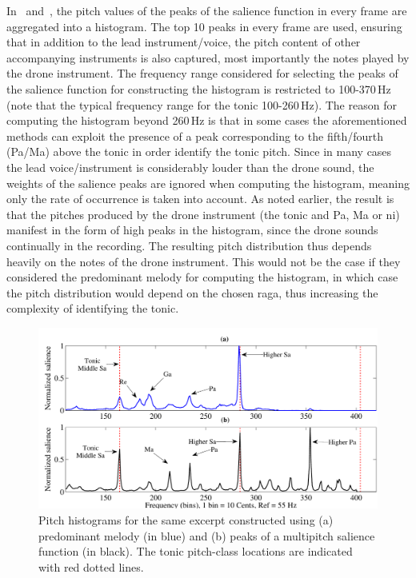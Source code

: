 In~\cite{salamon2012multipitch} and~\cite{gulati2012two}, the pitch values of the peaks of the salience function in every frame are aggregated into a histogram. The top 10 peaks in every frame are used, ensuring that in addition to the lead instrument/voice, the pitch content of other accompanying instruments is also captured, most importantly the notes played by the drone instrument. The frequency range considered for selecting the peaks of the salience function for constructing the histogram is restricted to 100-370\,Hz (note that the typical frequency range for the tonic 100-260\,Hz). The reason for computing the histogram beyond 260\,Hz is that in some cases the aforementioned methods can exploit the presence of a peak corresponding to the fifth/fourth (Pa/Ma) above the tonic in order identify the tonic pitch. Since in many cases the lead voice/instrument is considerably louder than the drone sound, the weights of the salience peaks are ignored when computing the histogram, meaning only the rate of occurrence is taken into account. As noted earlier, the result is that the pitches produced by the drone instrument (the tonic and Pa, Ma or \acrshort{ni}) manifest in the form of high peaks in the histogram, since the drone sounds continually in the recording. The resulting pitch distribution thus depends heavily on the notes of the drone instrument. This would not be the case if they considered the predominant melody for computing the histogram, in which case the pitch distribution would depend on the chosen \gls{raga}, thus increasing the complexity of identifying the tonic.

\begin{figure}
	\begin{center}
		\includegraphics[width=\figSizeHundred]{ch02_background/figures/Histogram_Melody_Multipitch.pdf}
	\end{center}
	\caption[Pitch histograms constructed using two different methods]{Pitch histograms for the same excerpt constructed using (a) predominant melody (in blue) and (b) peaks of a multipitch salience function (in black). The tonic pitch-class locations are indicated with red dotted lines.}
	\label{fig:background_pitch_histograms_multipitch}
\end{figure}

